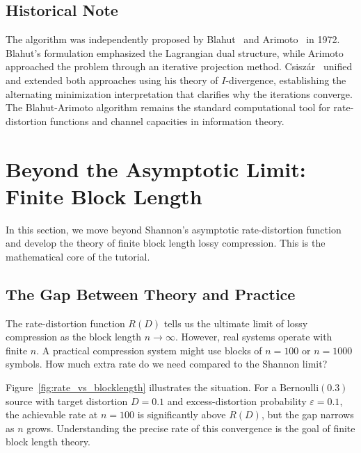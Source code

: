 \documentclass[11pt]{article}
\newcommand{\RD}{R(D)}
\newcommand{\Ber}{\mathrm{Bernoulli}}
\begin{document}
\subsection{Historical Note}
\label{subsec:ba_history}

The algorithm was independently proposed by Blahut~\cite{blahut1972} and
Arimoto~\cite{arimoto1972} in 1972.
Blahut's formulation emphasized the Lagrangian dual structure, while Arimoto
approached the problem through an iterative projection method.
Csisz\'{a}r~\cite{csiszar1974} unified and extended both approaches using
his theory of $I$-divergence, establishing the alternating minimization
interpretation that clarifies why the iterations converge.
The Blahut-Arimoto algorithm remains the standard computational tool for
rate-distortion functions and channel capacities in information theory.


\section{Beyond the Asymptotic Limit: Finite Block Length}
\label{sec:finite_blocklength}

In this section, we move beyond Shannon's asymptotic rate-distortion function
and develop the theory of finite block length lossy compression.
This is the mathematical core of the tutorial.

\subsection{The Gap Between Theory and Practice}
\label{subsec:gap}

The rate-distortion function $\RD$ tells us the ultimate limit of lossy
compression as the block length $n \to \infty$.
However, real systems operate with finite $n$.
A practical compression system might use blocks of $n = 100$ or $n = 1000$
symbols.
How much extra rate do we need compared to the Shannon limit?

Figure~\ref{fig:rate_vs_blocklength} illustrates the situation.
For a $\Ber(0.3)$ source with target distortion $D = 0.1$ and excess-distortion
probability $\varepsilon = 0.1$, the achievable rate at $n = 100$ is
significantly above $\RD$, but the gap narrows as $n$ grows.
Understanding the precise rate of this convergence is the goal of finite block
length theory.
\end{document}
